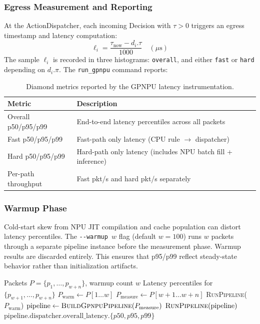 \documentclass[11pt,a4paper,twoside]{article}
\theoremstyle{definition}
\theoremstyle{remark}
\begin{document}
\subsubsection{Egress Measurement and Reporting}

At the ActionDispatcher, each incoming Decision with $\tau > 0$ triggers an egress timestamp and latency computation:
\begin{equation}
\ell_i = \frac{\tau_{\text{now}} - d_i.\tau}{1000} \quad (\mu\text{s})
\end{equation}
The sample $\ell_i$ is recorded in three histograms: \texttt{overall}, and either \texttt{fast} or \texttt{hard} depending on $d_i.\pi$. The \texttt{run\_gpnpu} command reports:

\begin{table}[H]
\centering
\small
\begin{tabular}{lp{8cm}}
\toprule
\textbf{Metric} & \textbf{Description} \\
\midrule
Overall p50/p95/p99 & End-to-end latency percentiles across all packets \\
Fast p50/p95/p99    & Fast-path only latency (CPU rule $\to$ dispatcher) \\
Hard p50/p95/p99    & Hard-path only latency (includes NPU batch fill + inference) \\
Per-path throughput & Fast pkt/s and hard pkt/s separately \\
\bottomrule
\end{tabular}
\caption{Diamond metrics reported by the GPNPU latency instrumentation.}
\label{tab:gpnpu-diamond-metrics}
\end{table}

\subsubsection{Warmup Phase}

Cold-start skew from NPU JIT compilation and cache population can distort latency percentiles. The \texttt{-{}-warmup $w$} flag (default $w = 100$) runs $w$ packets through a separate pipeline instance before the measurement phase. Warmup results are discarded entirely. This ensures that p95/p99 reflect steady-state behavior rather than initialization artifacts.

\begin{algorithm}[H]
\caption{GPNPU Latency Measurement with Warmup}
\begin{algorithmic}[1]
\Require Packets $P = \{p_1, \ldots, p_{w+n}\}$, warmup count $w$
\Ensure Latency percentiles for $\{p_{w+1}, \ldots, p_{w+n}\}$
\State $P_{\text{warm}} \gets P[1 \ldots w]$
\State $P_{\text{measure}} \gets P[w{+}1 \ldots w{+}n]$
\State \textsc{RunPipeline}($P_{\text{warm}}$) 
\State $\text{pipeline} \gets \textsc{BuildGpnpuPipeline}(P_{\text{measure}})$
\State $\textsc{RunPipeline}(\text{pipeline})$
\State \Return $\text{pipeline.dispatcher.overall\_latency}.\{p50, p95, p99\}$
\end{algorithmic}
\end{algorithm}
\end{document}
